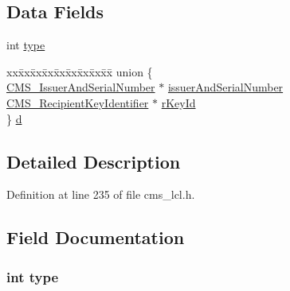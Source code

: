 \subsection*{Data Fields}
\begin{DoxyCompactItemize}
\item 
int \hyperlink{struct_c_m_s___key_agree_recipient_identifier__st_ac765329451135abec74c45e1897abf26}{type}
\item 
\begin{tabbing}
xx\=xx\=xx\=xx\=xx\=xx\=xx\=xx\=xx\=\kill
union \{\\
\>\hyperlink{cms__lcl_8h_a161c64a652f5a8893905640ecf4123b9}{CMS\_IssuerAndSerialNumber} $\ast$ \hyperlink{struct_c_m_s___key_agree_recipient_identifier__st_a19b1fce417820be55efb728bcb0877bf}{issuerAndSerialNumber}\\
\>\hyperlink{cms__lcl_8h_a26bd3673afe7e2e7a95c254027cb7e81}{CMS\_RecipientKeyIdentifier} $\ast$ \hyperlink{struct_c_m_s___key_agree_recipient_identifier__st_a7cd33055e67ff40a2cdc012091efff0f}{rKeyId}\\
\} \hyperlink{struct_c_m_s___key_agree_recipient_identifier__st_a08129f0738ff51df86b71beeadade116}{d}\\

\end{tabbing}\end{DoxyCompactItemize}


\subsection{Detailed Description}


Definition at line 235 of file cms\+\_\+lcl.\+h.



\subsection{Field Documentation}
\subsubsection[{\texorpdfstring{type}{type}}]{\setlength{\rightskip}{0pt plus 5cm}int type}\hypertarget{struct_c_m_s___key_agree_recipient_identifier__st_ac765329451135abec74c45e1897abf26}{}\label{struct_c_m_s___key_agree_recipient_identifier__st_ac765329451135abec74c45e1897abf26}


